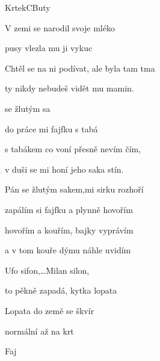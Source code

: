 ﻿\setcounter{page}{45}
\begin{song}{Krtek}{C}{Buty}

\begin{SBChorus*}

V zemi se narodil   svoje mléko 

 pusy vlezla mu   ji vykuc 

Chtěl se na ni podívat, ale byla tam tma

ty nikdy nebudeš vidět  mu mamin.

\end{SBChorus*}

\begin{SBChorus*}

 se žlutým sa

do práce mi  fajfku s tabá

s tabákem co voní přesně nevím čím,

v duši se mi honí jeho saka stín.

Pán se žlutým sakem,mi sirku rozhoří

zapálím si fajfku a plynně hovořím

hovořím a kouřím, bajky vyprávím

a v tom kouře dýmu náhle uvidím

Ufo sifon,…Milan silon,

to pěkně zapadá, kytka lopata

\end{SBChorus*}

\begin{SBChorus*}

Lopata do země  se škvír

 normální   až na krt

Faj

\end{SBChorus*}

\end{song}

\clearpage

